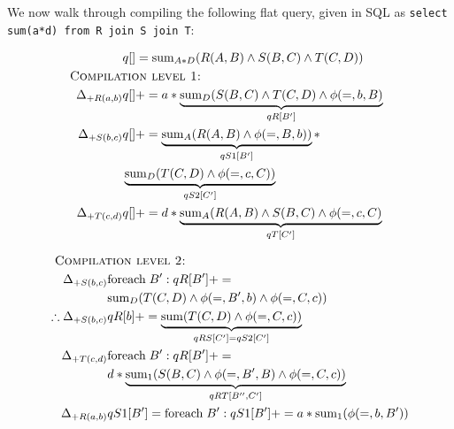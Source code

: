 \begin{example}
We now walk through compiling the following flat query, given in SQL as
\texttt{select sum(a*d) from R join S join T}:

\vspace{-3mm}
\begin{align*}
& q[] = \algsum_{A*D}(R(A,B) \wedge S(B,C) \wedge T(C,D))\\
& \hspace{-1.5cm}\mbox{\sc Compilation level 1:}\\
\Delta_{+R(a,b)} & q[] +=
a * \underbrace{\algsum_{D}(S(B,C) \wedge T(C,D) \wedge \phi(=,b,B)}_{qR[B']}\\
\Delta_{+S(b,c)} & q[] +=
\underbrace{\algsum_{A}(R(A,B) \wedge \phi(=,B,b))}_{qS1[B']} * \\
& \underbrace{\algsum_{D}(T(C,D) \wedge \phi(=,c,C))}_{qS2[C']}\\
\Delta_{+T(c,d)} & q[] +=
d * \underbrace{\algsum_{A}(R(A,B) \wedge S(B,C) \wedge \phi(=,c,C)}_{qT[C']}\\
\end{align*}

\vspace{-10mm}
\begin{align*}
& \hspace{-1.5cm}\mbox{\sc Compilation level 2:}\\
\Delta_{+S(b,c)} & \algforeach \; B': qR[B'] += \\
& \algsum_{D}(T(C,D) \wedge \phi(=,B',b) \wedge \phi(=,C,c))
 \\
\therefore \Delta_{+S(b,c)} & qR[b] +=
\underbrace{\algsum(T(C,D) \wedge \phi(=,C,c))}_{qRS[C'] = qS2[C']}
\\
\Delta_{+T(c,d)} & \algforeach \; B': qR[B'] +=  \\
& d * \underbrace{\algsum_{1}(S(B,C) \wedge \phi(=,B',B) \wedge
  \phi(=,C,c))}_{qRT[B'',C']}
\\
\Delta_{+R(a,b)} & qS1[B'] = \algforeach \; B': qS1[B'] +=
a * \algsum_{1}(\phi(=,b,B'))
\end{align*}


\end{example}
